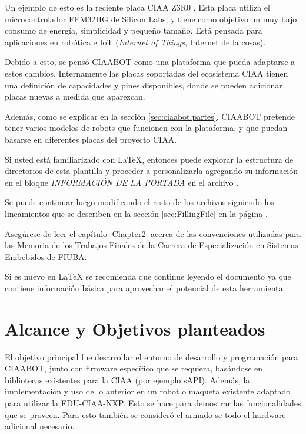 Un ejemplo de esto es la reciente placa CIAA Z3R0 \citep{CIAA:z3r0}. Esta placa utiliza el microcontrolador EFM32HG de Silicon Labs, y tiene como objetivo un muy bajo consumo de energía, simplicidad y pequeño tamaño. Está pensada para aplicaciones en robótica e IoT (\emph{Internet of Things}, Internet de la cosas).

Debido a esto, se pensó CIAABOT como una plataforma que pueda adaptarse a estos cambios. Internamente las placas soportadas del ecosistema CIAA tienen una definición de capacidades y pines disponibles, donde se pueden adicionar placas nuevas a medida que aparezcan.

Además, como se explicar en la sección \ref{sec:ciaabot:partes}, CIAABOT pretende tener varios modelos de robots que funcionen con la plataforma, y que puedan basarse en diferentes placas del proyecto CIAA.


Si usted está familiarizado con \LaTeX{}, entonces puede explorar la estructura de directorios de esta plantilla y proceder a personalizarla agregando su información en el bloque \emph{INFORMACIÓN DE LA PORTADA} en el archivo .  

Se puede continuar luego modificando el resto de los archivos siguiendo los lineamientos que se describen en la sección \ref{sec:FillingFile} en la página \pageref{sec:FillingFile}.

Asegúrese de leer el capítulo \ref{Chapter2} acerca de las convenciones utilizadas para las Memoria de los Trabajos Finales de la Carrera de Especialización en Sistemas Embebidos de FIUBA.

Si es nuevo en \LaTeX{} se recomienda que continue leyendo el documento ya que contiene información básica para aprovechar el potencial de esta herramienta.


\section{Alcance y Objetivos planteados}
\label{sec:alcance}
El objetivo principal fue desarrollar el entorno de desarrollo y programación para CIAABOT, junto con firmware específico que se requiera, basándose en bibliotecas existentes para la CIAA (por ejemplo sAPI). Además, la implementación y uso de lo anterior en un robot o maqueta existente adaptado para utilizar la EDU-CIAA-NXP. Esto se hace para demostrar las funcionalidades que se proveen. Para esto también se consideró el armado se todo el hardware adicional necesario.

